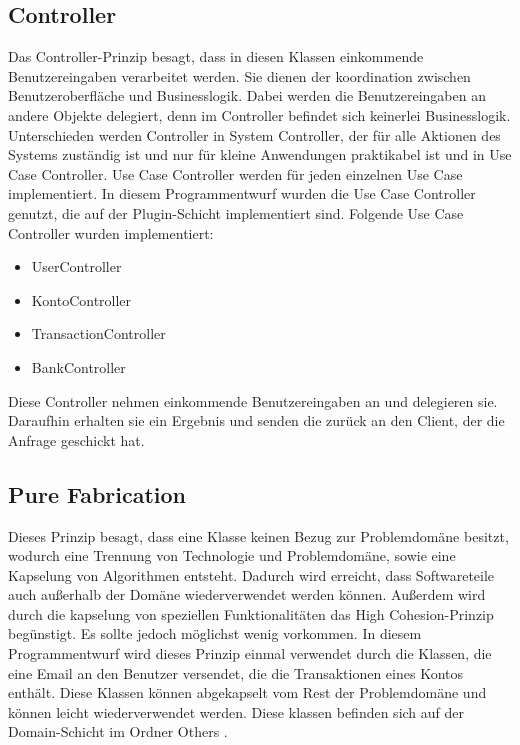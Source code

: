 \subsection{Controller}
Das Controller-Prinzip besagt, dass in diesen Klassen einkommende Benutzereingaben verarbeitet werden. Sie dienen der koordination zwischen Benutzeroberfläche und Businesslogik. Dabei werden 
die Benutzereingaben an andere Objekte delegiert, denn im Controller befindet sich keinerlei Businesslogik. 
\newline Unterschieden werden Controller in System Controller, der für alle Aktionen des Systems zuständig ist und nur für kleine Anwendungen praktikabel ist und in Use Case Controller. Use Case Controller 
werden für jeden einzelnen Use Case implementiert.
\newline In diesem Programmentwurf wurden die Use Case Controller genutzt, die auf der Plugin-Schicht implementiert sind. Folgende Use Case Controller wurden implementiert:
\begin{itemize}
    \item UserController
    \item KontoController
    \item TransactionController
    \item BankController
\end{itemize}
Diese Controller nehmen einkommende Benutzereingaben an und delegieren sie. Daraufhin erhalten sie ein Ergebnis und senden die zurück an den Client, der die Anfrage geschickt hat.
\subsection{Pure Fabrication}
Dieses Prinzip besagt, dass eine Klasse keinen Bezug zur Problemdomäne besitzt, wodurch eine Trennung von Technologie und Problemdomäne, sowie eine Kapselung von Algorithmen entsteht. Dadurch wird erreicht, 
dass Softwareteile auch außerhalb der Domäne wiederverwendet werden können. Außerdem wird durch die kapselung von speziellen Funktionalitäten das High Cohesion-Prinzip begünstigt. Es sollte jedoch möglichst wenig vorkommen.
\newline In diesem Programmentwurf wird dieses Prinzip einmal verwendet durch die Klassen, die eine Email an den Benutzer versendet, die die Transaktionen eines Kontos enthält. Diese Klassen können abgekapselt vom Rest der 
Problemdomäne und können leicht wiederverwendet werden. Diese klassen befinden sich auf der Domain-Schicht im Ordner \glqq Others \grqq .
